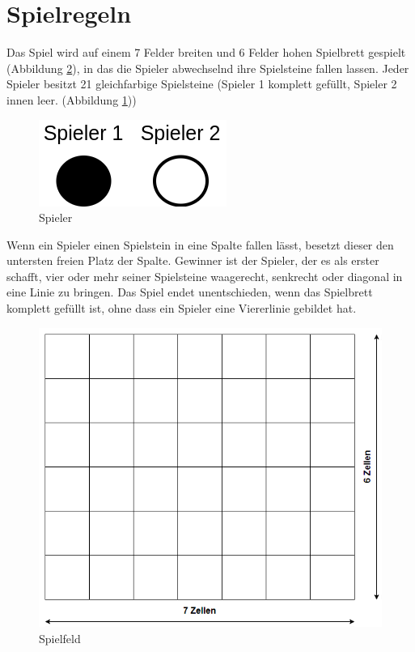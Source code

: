 \section{Spielregeln}
    Das Spiel wird auf einem 7 Felder breiten und 6 Felder hohen Spielbrett gespielt (Abbildung \ref{spielfeld}),
    in das die Spieler abwechselnd ihre Spielsteine fallen lassen. Jeder Spieler besitzt 21 gleichfarbige Spielsteine (Spieler 1 komplett gefüllt, Spieler 2 innen leer. (Abbildung \ref{spieler}))
    \begin{figure}[H]
        \centering
        \label{spieler}
        \includegraphics[scale=0.5]{img/spieler.png}    
        \caption{Spieler}
    \end{figure}
    Wenn ein Spieler einen Spielstein in eine Spalte fallen lässt, besetzt dieser den untersten freien Platz der Spalte.
    Gewinner ist der Spieler, der es als erster schafft, vier oder mehr seiner Spielsteine waagerecht, senkrecht oder diagonal in eine Linie zu bringen.
    Das Spiel endet unentschieden, wenn das Spielbrett komplett gefüllt ist, ohne dass ein Spieler eine Viererlinie gebildet hat.
    \begin{figure}[H]
        \centering
        \label{spielfeld}
        \includegraphics[scale=0.5]{img/spielfeld.png}    
        \caption{Spielfeld}
    \end{figure}